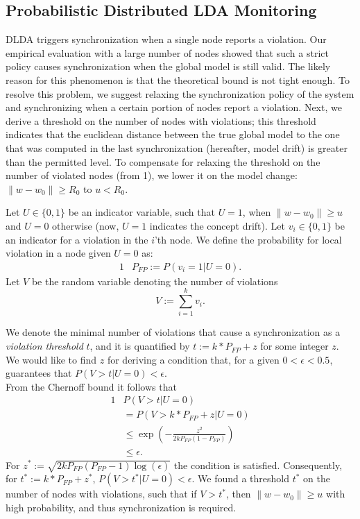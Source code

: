 \subsection{Probabilistic Distributed LDA Monitoring}\label{sec:PDLDA}

DLDA triggers synchronization when a single node reports a violation.
Our empirical evaluation with a large number of nodes showed that such a strict
policy causes synchronization when the global model is still valid. The likely
reason for this phenomenon is that the theoretical bound is not tight enough.
To resolve this problem, we suggest relaxing the synchronization policy of
the system and synchronizing when a certain portion of nodes report a violation.
Next, we derive a threshold on the number of nodes with violations; this threshold indicates that the euclidean distance between the true global model to the one that was computed in the last synchronization (hereafter, model drift) is greater than the permitted level.
To compensate for relaxing the threshold on the number of violated nodes
(from 1), we lower it on the model change: $\|w-w_0\| \geq R_0$
to $u<R_0$.

Let $U\in\{0,1\}$ be an indicator variable, such that $U=1$,
when $\|w-w_0\| \geq u$ and $U=0$ otherwise (now, $U=1$ indicates the concept drift).
Let $v_i \in \{0,1\}$ be an indicator for a violation in the
$i$'th node. We define the probability for local violation in a node given $U=0$ as:
\begin{alignat*}{1}
& P_{FP} := P(v_i=1 | U=0).
\end{alignat*}
Let $V$ be the random variable denoting the number of violations
\begin{equation*}
V := \sum_{i=1}^k v_i.
\end{equation*}

We denote the minimal number of violations that cause a synchronization
as a \textit{violation threshold} $t$, and it is quantified by
$t:=k*P_{FP}+z$ for some integer $z$.
We would like to find $z$ for deriving a condition that, for a given $0 < \epsilon < 0.5$,
guarantees that
$P(V>t|U=0) < \epsilon$.
\\From the Chernoff bound it follows that
\begin{alignat*}{1}
& P(V>t | U=0) \\
& = P(V>k*P_{FP}+z | U=0) \\
& \leq \exp(-\frac{z^2}{2kP_{FP}(1-P_{FP})}) \\
& \leq \epsilon.
\end{alignat*}
For $z^*:=\sqrt{2kP_{FP}(P_{FP}-1)\log(\epsilon)}$ the condition is satisfied.
Consequently, for $t^*:=k*P_{FP}+z^*$,  $P(V > t^*|U=0) < \epsilon$.
We found a threshold $t^*$ on the number of nodes with violations, such that if $V > t^*$,  then
$\|w-w_0\| \geq u$ with high probability, and thus synchronization is required.

